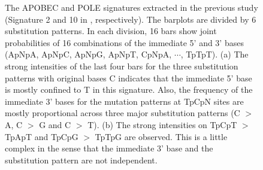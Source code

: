 \begin{figure}[b]
\centering
{}
  
  
\caption{The APOBEC and POLE signatures extracted in the previous study (Signature 2 and 10 in \cite{pmid23945592}, respectively).
The barplots are divided by 6 substitution patterns.
In each division, 16 bars show joint probabilities of 16 combinations of the immediate 5' and 3' bases  
(ApNpA, ApNpC, ApNpG, ApNpT, CpNpA, $\cdots$, TpTpT).
(a) The strong intensities of the last four bars for the three substitution patterns with original bases C 
indicates that the immediate 5' base is mostly confined to T in this signature.
Also, the frequency of the immediate 3' bases for the mutation patterns at TpCpN sites are mostly proportional across three major substitution patterns (C $>$ A, C $>$ G and C $>$ T).
(b) The strong intensities on TpCpT $>$ TpApT and TpCpG $>$ TpTpG are observed. This is a little complex in the sense that 
the immediate 3' base and the substitution pattern are not independent.
}
\label{nature2013_example}
\end{figure}

\clearpage

